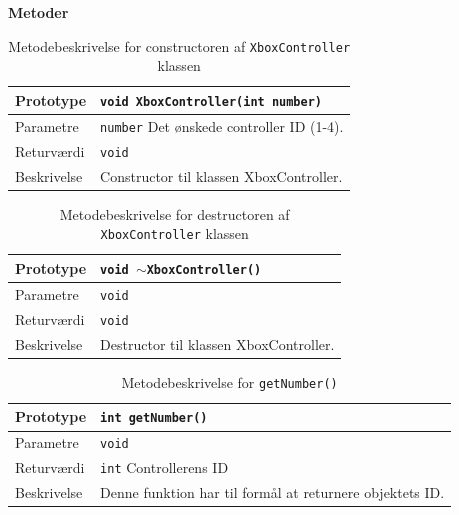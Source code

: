 \textbf{Metoder}

\begin{table}[h]
\begin{tabularx}{\textwidth}{| L{2.5 cm} | Z |} \hline
Prototype 	& \texttt{void XboxController(int number)} \\\hline
Parametre 	& \texttt{number} 			\newline Det ønskede controller ID (1-4). \\\hline
Returværdi	& \texttt{void} 			\newline \\\hline
Beskrivelse	& Constructor til klassen XboxController. \newline \\\hline
\end{tabularx}
\caption{Metodebeskrivelse for constructoren af \texttt{XboxController} klassen}
\label{table:met_xboxcontroller}
\end{table}

\clearpage

\begin{table}[h]
\begin{tabularx}{\textwidth}{| L{2.5 cm} | Z |} \hline
Prototype 	& \texttt{void $\sim$XboxController()} \\\hline
Parametre 	& \texttt{void}				\newline \\\hline
Returværdi	& \texttt{void} 			\newline \\\hline
Beskrivelse	& Destructor til klassen XboxController. \newline \\\hline
\end{tabularx}
\caption{Metodebeskrivelse for destructoren af \texttt{XboxController} klassen}
\label{table:met_xboxcontroller_de}
\end{table}

\begin{table}[h]
\begin{tabularx}{\textwidth}{| L{2.5 cm} | Z |} \hline
Prototype 	& \texttt{int getNumber()} \\\hline
Parametre 	& \texttt{void}				\newline \\\hline
Returværdi	& \texttt{int} 				\newline Controllerens ID \\\hline
Beskrivelse	& Denne funktion har til formål at returnere objektets ID. \newline \\\hline
\end{tabularx}
\caption{Metodebeskrivelse for \texttt{getNumber()}}
\label{table:met_getnumber}
\end{table}

